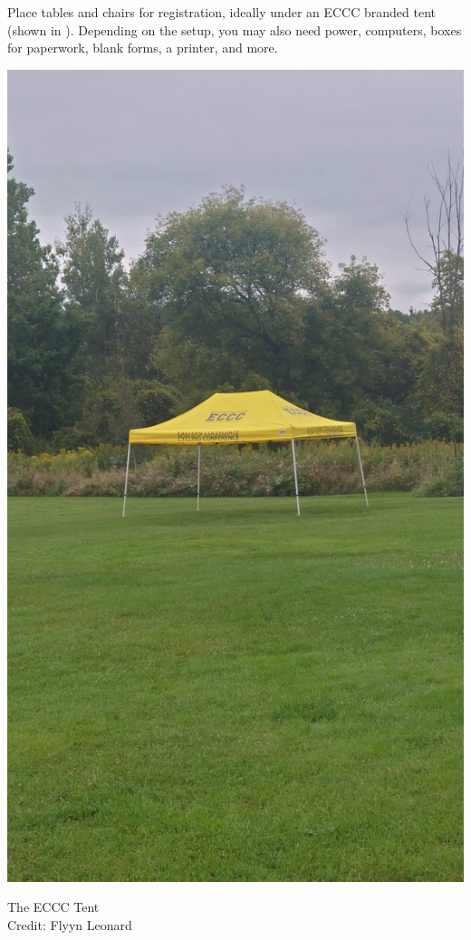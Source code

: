\documentclass[
  letterpaper, %
  fontsize=10pt, %
  twoside=true,
  chapterentrydots=true, %
  numbers=noenddot,
  fontmethod=tex,
]{kaobook}
\begin{document}
Place tables and chairs for registration,
ideally under an ECCC branded tent (shown in ). %
Depending on the setup, you may also need power,
computers, boxes for paperwork, blank forms, a printer, and more.

\begin{marginfigure}[60pt]
\includegraphics{eccc_tent.jpg}
\caption[The ECCC Tent]{The ECCC Tent\\
          Credit: Flyyn Leonard}
\end{marginfigure}
\end{document}
